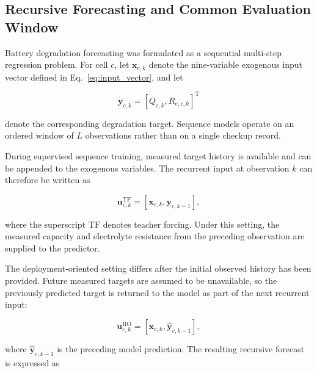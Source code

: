 \documentclass[a4paper,fleqn]{cas-sc}
\begin{document}

\subsection{Recursive Forecasting and Common Evaluation Window}
\label{sec:recursive_formulation}

Battery degradation forecasting was formulated as a sequential multi-step regression problem. For cell $c$, let $\mathbf{x}_{c,k}$ denote the nine-variable exogenous input vector defined in Eq.~\eqref{eq:input_vector}, and let

\begin{equation}
\mathbf{y}_{c,k}
=
\left[
Q_{c,k},
R_{e,c,k}
\right]^{\mathrm{T}}
\end{equation}

denote the corresponding degradation target. Sequence models operate on an ordered window of $L$ observations rather than on a single checkup record.

During supervised sequence training, measured target history is available and can be appended to the exogenous variables. The recurrent input at observation $k$ can therefore be written as

\begin{equation}
\mathbf{u}^{\mathrm{TF}}_{c,k}
=
\left[
\mathbf{x}_{c,k},
\mathbf{y}_{c,k-1}
\right],
\label{eq:teacher_input}
\end{equation}

where the superscript $\mathrm{TF}$ denotes teacher forcing. Under this setting, the measured capacity and electrolyte resistance from the preceding observation are supplied to the predictor.

The deployment-oriented setting differs after the initial observed history has been provided. Future measured targets are assumed to be unavailable, so the previously predicted target is returned to the model as part of the next recurrent input:

\begin{equation}
\mathbf{u}^{\mathrm{RO}}_{c,k}
=
\left[
\mathbf{x}_{c,k},
\hat{\mathbf{y}}_{c,k-1}
\right],
\label{eq:rollout_input}
\end{equation}

where $\hat{\mathbf{y}}_{c,k-1}$ is the preceding model prediction. The resulting recursive forecast is expressed as
\end{document}
